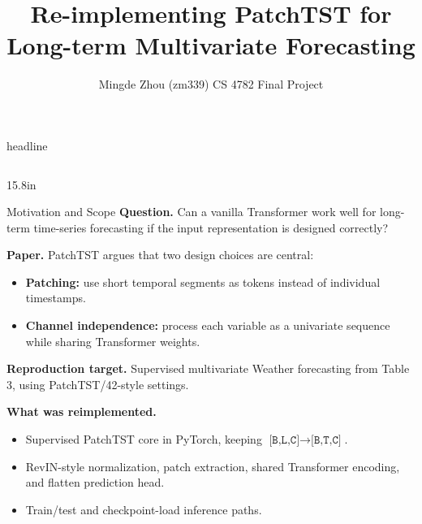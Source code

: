 \documentclass[final]{beamer}
\title{\textbf{Re-implementing PatchTST for Long-term Multivariate Forecasting}}
\author{Mingde Zhou (zm339) \quad CS 4782 Final Project}
\institute{\href{https://github.com/MingdeZhou/PatchTST}{github.com/MingdeZhou/PatchTST}}
\begin{document}
\begin{frame}[t]

\begin{beamercolorbox}[wd=\paperwidth,sep=0pt]{headline}
  \begin{minipage}[t][2.45in][c]{\paperwidth}
    \hspace*{1.0in}
    \begin{minipage}{34in}
      {\fontsize{33}{38}\selectfont \inserttitle \par}
      \vspace{0.22in}
      {\fontsize{18}{22}\selectfont \insertauthor \hfill \insertinstitute \par}
    \end{minipage}
  \end{minipage}
\end{beamercolorbox}

\vspace{0.18in}
\begin{columns}[t,totalwidth=33.2in]

\begin{column}{15.8in}

\begin{block}{Motivation and Scope}
\textbf{Question.} Can a vanilla Transformer work well for long-term time-series forecasting if the input representation is designed correctly?

\vspace{0.25em}
\textbf{Paper.} PatchTST argues that two design choices are central:
\begin{itemize}
  \item \textbf{Patching:} use short temporal segments as tokens instead of individual timestamps.
  \item \textbf{Channel independence:} process each variable as a univariate sequence while sharing Transformer weights.
\end{itemize}

\vspace{0.25em}
\textbf{Reproduction target.} Supervised multivariate Weather forecasting from Table 3, using PatchTST/42-style settings.

\vspace{0.25em}
\textbf{What was reimplemented.}
\begin{itemize}
  \item Supervised PatchTST core in PyTorch, keeping \(\texttt{[B,L,C]}\rightarrow\texttt{[B,T,C]}\).
  \item RevIN-style normalization, patch extraction, shared Transformer encoding, and flatten prediction head.
  \item Train/test and checkpoint-load inference paths.
\end{itemize}
\end{block}


\end{column}
\end{columns}
\end{frame}
\end{document}
